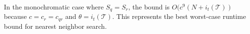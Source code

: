 


%


In the monochromatic case where $S_q = S_r$, the bound is $O(c^9 (N +
i_t(\mathscr{T}))$ because $c = c_r = c_{qr}$ and $\theta = i_t(\mathscr{T})$.
This represents the best worst-case runtime bound for nearest neighbor search.
